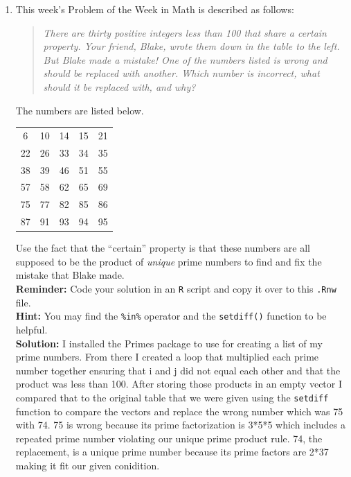 \documentclass{article}\usepackage[]{graphicx}\usepackage[]{xcolor}
\begin{document}
\begin{enumerate}
\item This week's Problem of the Week in Math is described as follows:
\begin{quotation}
  \textit{There are thirty positive integers less than 100 that share a certain 
  property. Your friend, Blake, wrote them down in the table to the left. But 
  Blake made a mistake! One of the numbers listed is wrong and should be replaced 
  with another. Which number is incorrect, what should it be replaced with, and 
  why?}
\end{quotation}
The numbers are listed below.
\begin{center}
  \begin{tabular}{ccccc}
    6 & 10 & 14 & 15 & 21\\
    22 & 26 & 33 & 34 & 35\\
    38 & 39 & 46 & 51 & 55\\
    57 & 58 & 62 & 65 & 69\\
    75 & 77 & 82 & 85 & 86\\
    87 & 91 & 93 & 94 & 95
  \end{tabular}
\end{center}
Use the fact that the ``certain'' property is that these numbers are all supposed
to be the product of \emph{unique} prime numbers to find and fix the mistake that
Blake made.\\
\textbf{Reminder:} Code your solution in an \texttt{R} script and copy it over
to this \texttt{.Rnw} file.\\
\textbf{Hint:} You may find the \verb|%in%| operator and the \verb|setdiff()| function to be helpful.\\

\textbf{Solution:} 
I installed the Primes package \citep{primes} to use for creating a list of my prime numbers. From there I created a loop that multiplied each prime number together ensuring that i and j did not equal each other and that the product was less than 100. After storing those products in an empty vector I compared that to the original table that we were given using the \texttt{setdiff} function to compare the vectors and replace the wrong number which was 75 with 74. 75 is wrong because its prime factorization is 3*5*5 which includes a repeated prime number violating our unique prime product rule. 74, the replacement, is a unique prime number because its prime factors are 2*37 making it fit our given conidition.


\end{enumerate}
\end{document}
